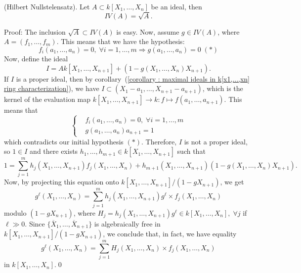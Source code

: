\begin{dang}
    \begin{theorem}\label{theorem : Hilbert Nullstelensatz}
        (Hilbert Nullstelensatz). Let $A\subset k[X_1,\dots, X_n]$ be an ideal, then 
        \begin{equation}
            IV(A) = \sqrt{A}.
        \end{equation}
    \end{theorem}
\end{dang}
Proof: The inclusion $\sqrt{A}\subset IV(A)$ is easy. Now, assume $g\in IV(A)$, where $A=(f_1,\dots, f_m)$. This 
means that we have the hypothesis:
\begin{equation}
    f_i(a_1,\dots, a_n)=0,\;\forall i=1,\dots,m\Rightarrow g(a_1,\dots, a_n)=0\; (*)
\end{equation}
Now, define the ideal 
\begin{equation}
    I = Ak[X_1,\dots, X_{n+1}] + (1- g(X_1,\dots, X_n)X_{n+1}).
\end{equation}
If $I$ is a proper ideal, then by corollary~(\ref{corollary : maximal ideals in k[x1,...,xn] ring characterization}), we have 
$I\subset (X_1-a_1,\dots, X_{n+1}-a_{n+1})$, which is the kernel of the evaluation map 
$k[X_1,\dots,X_{n+1}]\rightarrow k: f\mapsto f(a_1,\dots, a_{n+1})$. This means that 
\begin{equation}
    \left\{\begin{aligned}
        &f_i(a_1,\dots,a_n)=0,\;\forall i=1,\dots,m\\
        &g(a_1,\dots,a_n)a_{n+1}=1
    \end{aligned}\right.
\end{equation}
which contradicts our initial hypothesis $(*)$. Therefore, $I$ is not a proper ideal, so $1\in I$ and there exists 
$h_1,\dots, h_{m+1}\in k[X_1,\dots, X_{n+1}]$ such that 
\begin{equation}
    1 = \sum_{j=1}^mh_j(X_1,\dots, X_{n+1})f_j(X_1,\dots,X_n)  + h_{m+1}(X_1,\dots,X_{n+1})(1-g(X_1,\dots,X_n)X_{n+1}).
\end{equation}
Now, by projecting this equation onto $k[X_1,\dots, X_{n+1}]/(1-g X_{n+1})$, we get 
\begin{equation}
    g^\ell(X_1,\dots,X_n) = \sum_{j=1}^m h_j(X_1,\dots, X_{n+1})g^\ell  \times f_j(X_1,\dots,X_n)
\end{equation}
modulo $(1-g X_{n+1})$, where $H_j = h_j(X_1,\dots, X_{n+1})g^\ell\in k[X_1,\dots,X_n],\;\forall j$ if $\ell\gg0$. 
Since $\{\overline{X}_1,\dots,\overline{X}_{n+1}\}$ is algebraically free in $k[X_1,\dots, X_{n+1}]/(1-g X_{n+1})$, we 
conclude that, in fact, we have equality 
\begin{equation}
     g^\ell(X_1,\dots,X_n) = \sum_{j=1}^m H_j(X_1,\dots,X_n)  \times f_j(X_1,\dots,X_n)
\end{equation}
in $k[X_1,\dots,X_n]$.\qed

